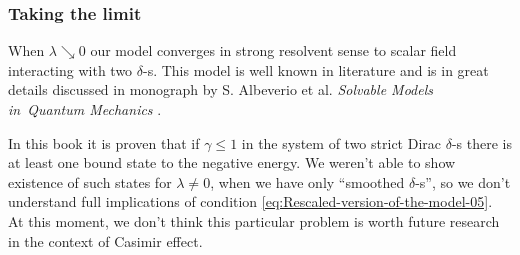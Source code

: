 \documentclass[10pt,t]{beamer}
\begin{document}





\begin{frame}
  \frametitle{Taking the limit}




  When $\lambda \searrow 0$ our model converges in strong resolvent sense to scalar
  field interacting with two $\delta$-s. This model is well known in literature
  and is in great details discussed in monograph by S. Albeverio et al.
  \textit{Solvable Models in~Quantum Mechanics}
  \parencite{Albeverio-et-al-Solvable-Models-in-Quantum-Mechanics-Pub-1988}.

  In this book it is proven that if $\gamma \leq 1$ in the system of two strict
  Dirac $\delta$-s there \alert{is} at least one bound state to the negative
  energy. We weren't able to show existence of such states for $\lambda \neq 0$,
  when we have only ``smoothed $\delta$-s'', so we don't understand full
  implications of condition \eqref{eq:Rescaled-version-of-the-model-05}.
  At this moment, we don't think this particular problem is worth future
  research in the context of Casimir effect.



\end{frame}
\end{document}
